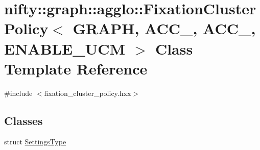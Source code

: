 \hypertarget{classnifty_1_1graph_1_1agglo_1_1FixationClusterPolicy}{}\section{nifty\+:\+:graph\+:\+:agglo\+:\+:Fixation\+Cluster\+Policy$<$ G\+R\+A\+PH, A\+C\+C\+\_, A\+C\+C\+\_, E\+N\+A\+B\+L\+E\+\_\+\+U\+CM $>$ Class Template Reference}
\label{classnifty_1_1graph_1_1agglo_1_1FixationClusterPolicy}


{\ttfamily \#include $<$fixation\+\_\+cluster\+\_\+policy.\+hxx$>$}

\subsection*{Classes}
\begin{DoxyCompactItemize}
\item 
struct \hyperlink{structnifty_1_1graph_1_1agglo_1_1FixationClusterPolicy_1_1SettingsType}{Settings\+Type}
\end{DoxyCompactItemize}
